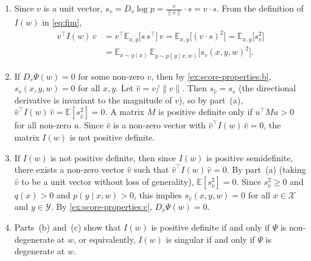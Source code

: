 \documentclass[11pt]{article}
\newcommand{\E}{\mathbb{E}}
\newcommand{\X}{\mathcal{X}}
\newcommand{\Y}{\mathcal{Y}}
\begin{document}
\begin{solution}
\begin{enumerate}
    \item
        Since $v$ is a unit vector,
        $s_v = D_v \log p = \frac{v}{\|v\|} \cdot s = v \cdot s$.
        From the definition of $I(w)$ in \eqref{eq:fim},
        \begin{align*}
            v^\top I(w)\, v
            &= v^\top
               \E_{x,y}\!\bigl[s\, s^\top\bigr]\, v
            = \E_{x,y}\!\bigl[(v \cdot s)^2\bigr]
            = \E_{x,y}\!\bigl[s_v^2\bigr]
        \\  &= \E_{x \sim q(x)}\,
               \E_{y \sim p(y \mid x, w)}\!\bigl[
                   s_v(x,y,w)^2
               \bigr].
        \end{align*}

    \item
        If $D_v \Psi(w) = 0$ for some non-zero $v$, then by
        \cref{ex:score-properties:b}, $s_{v}(x,y,w) = 0$ for all $x, y$.
        Let $\hat{v} = v / \|v\|$. Then $s_{\hat{v}} = s_v$ (the
        directional derivative is invariant to the magnitude of $v$), so
        by part~(a),
        $\hat{v}^\top I(w)\, \hat{v} = \E[s_{\hat{v}}^2] = 0$.
        A matrix $M$ is positive definite only if $u^\top M u > 0$ for
        all non-zero $u$. Since $\hat{v}$ is a non-zero vector with
        $\hat{v}^\top I(w)\, \hat{v} = 0$, the matrix $I(w)$ is not
        positive definite.

    \item
        If $I(w)$ is not positive definite, then since $I(w)$ is
        positive semidefinite, there exists a non-zero vector $\hat{v}$
        such that $\hat{v}^\top I(w)\, \hat{v} = 0$. By part~(a) (taking
        $\hat{v}$ to be a unit vector without loss of generality),
        $\E[s_{\hat{v}}^2] = 0$. Since $s_{\hat{v}}^2 \geq 0$ and
        $q(x) > 0$ and $p(y \mid x, w) > 0$, this implies
        $s_{\hat{v}}(x,y,w) = 0$ for all $x \in \X$ and $y \in \Y$.
        By \cref{ex:score-properties:c}, $D_{\hat{v}} \Psi(w) = 0$.

    \item
        Parts~(b) and~(c) show that $I(w)$ is positive definite if and
        only if $\Psi$ is non-degenerate at $w$, or equivalently, $I(w)$
        is singular if and only if $\Psi$ is degenerate at $w$.


\end{enumerate}
\end{solution}
\end{document}
